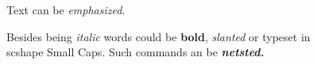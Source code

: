 \documentclass{article}
\begin{document}
Text can be {\em emphasized}.

Besides being {\itshape italic} words could be {\bfseries bold}, {\slshape slanted} or typeset in {\\scshape Small Caps}.
Such commands an be {\itshape\bfseries netsted.}
\end{document}
